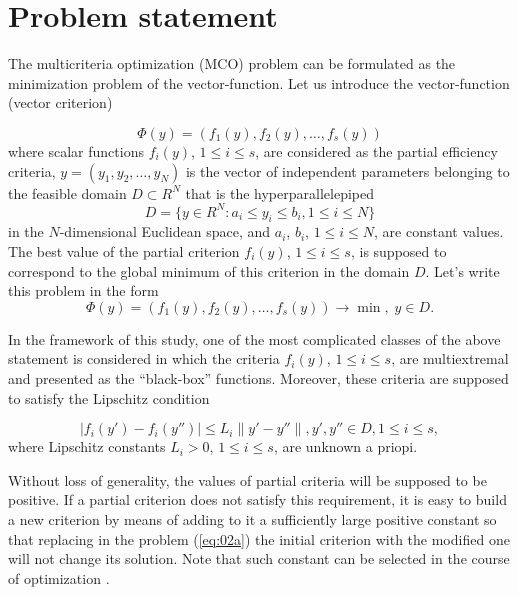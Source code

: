 \documentclass[runningheads]{llncs}
\begin{document}
\section{Problem statement}
\label{sec:2}

The multicriteria optimization (MCO) problem can be formulated as the minimization problem of the vector-function. Let us introduce the vector-function (vector criterion)

\begin{equation}
\label{eq:01}
  \Phi(y) = (f_1 (y),f_2 (y), \dots, f_s(y))
\end{equation}
where scalar functions $f_i(y)$, $1 \leq i \leq s$, are considered as the partial efficiency criteria, $y=(y_1,y_2, \dots ,y_N)$ is the vector of independent parameters belonging to the feasible domain $D \subset R^N$ that is the hyperparallelepiped
\begin{equation}
\label{eq:02}
    D=\{y \in R^N : a_i \leq y_i \leq b_i, 1 \leq i \leq N\}
\end{equation}
in the $N$-dimensional Euclidean space, and $a_i$, $b_i$, $1 \leq i \leq N$, are constant values.
The best value of the partial criterion $f_i(y)$, $1 \leq i \leq s$, is supposed to correspond to the global minimum of this criterion in the domain $D$.
Let's write this problem in the form
\begin{equation}
\label{eq:02a}
  \Phi(y) = (f_1 (y),f_2 (y), \dots, f_s(y)) \to \min, \; y \in D.
\end{equation}

In the framework of this study, one of the most complicated classes of the above statement is considered in which the criteria $f_i(y)$, $1 \leq i \leq s$, are multiextremal and presented as the ``black-box'' functions. Moreover, these criteria are supposed to satisfy the Lipschitz condition

\begin{equation}
\label{eq:03}
|f_i (y') - f_i (y'')| \leq L_i \|y' - y''\| ,y',y'' \in D, 1 \leq i \leq s,
\end{equation}
where Lipschitz constants $L_i>0$, $1 \leq i \leq s$, are unknown a priopi.  

Without loss of generality, the values of partial criteria will be supposed to be positive. If a partial criterion does not satisfy this requirement, it is easy to build a new criterion by means of adding to it a sufficiently large positive constant so that replacing in the problem (\ref{eq:02a}) the initial criterion with the modified one will not change its solution. Note that such constant can be selected in the course of optimization \cite{ML_MCO_2023}.
\end{document}
